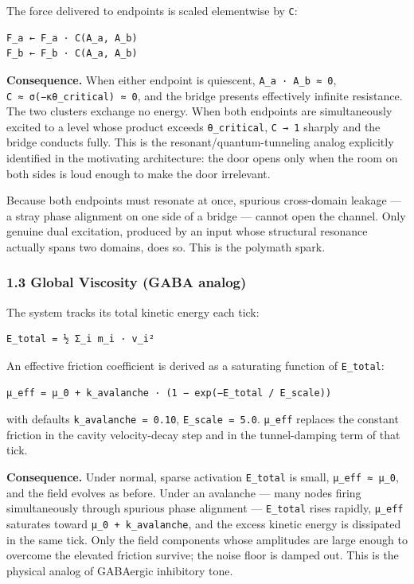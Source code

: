 \documentclass[
  11pt,
  a4paper,
]{article}
\begin{document}
The force delivered to endpoints is scaled elementwise by \texttt{C}:

\begin{verbatim}
F_a ← F_a · C(A_a, A_b)
F_b ← F_b · C(A_a, A_b)
\end{verbatim}

\textbf{Consequence.} When either endpoint is quiescent,
\texttt{A\_a\ ·\ A\_b\ ≈\ 0}, \texttt{C\ ≈\ σ(−κθ\_critical)\ ≈\ 0}, and
the bridge presents effectively infinite resistance. The two clusters
exchange no energy. When both endpoints are simultaneously excited to a
level whose product exceeds \texttt{θ\_critical}, \texttt{C\ →\ 1}
sharply and the bridge conducts fully. This is the
resonant/quantum-tunneling analog explicitly identified in the
motivating architecture: the door opens only when the room on both sides
is loud enough to make the door irrelevant.

Because both endpoints must resonate at once, spurious cross-domain
leakage --- a stray phase alignment on one side of a bridge --- cannot
open the channel. Only genuine dual excitation, produced by an input
whose structural resonance actually spans two domains, does so. This is
the polymath spark.

\subsubsection{1.3 Global Viscosity (GABA
analog)}\label{global-viscosity-gaba-analog}

The system tracks its total kinetic energy each tick:

\begin{verbatim}
E_total = ½ Σ_i m_i · v_i²
\end{verbatim}

An effective friction coefficient is derived as a saturating function of
\texttt{E\_total}:

\begin{verbatim}
μ_eff = μ_0 + k_avalanche · (1 − exp(−E_total / E_scale))
\end{verbatim}

with defaults \texttt{k\_avalanche\ =\ 0.10}, \texttt{E\_scale\ =\ 5.0}.
\texttt{μ\_eff} replaces the constant friction in the cavity
velocity-decay step and in the tunnel-damping term of that tick.

\textbf{Consequence.} Under normal, sparse activation \texttt{E\_total}
is small, \texttt{μ\_eff\ ≈\ μ\_0}, and the field evolves as before.
Under an avalanche --- many nodes firing simultaneously through spurious
phase alignment --- \texttt{E\_total} rises rapidly, \texttt{μ\_eff}
saturates toward \texttt{μ\_0\ +\ k\_avalanche}, and the excess kinetic
energy is dissipated in the same tick. Only the field components whose
amplitudes are large enough to overcome the elevated friction survive;
the noise floor is damped out. This is the physical analog of GABAergic
inhibitory tone.
\end{document}
